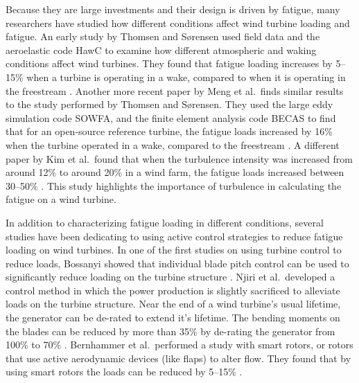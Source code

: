 \documentclass[11pt,letterpaper]{article}
\begin{document}
Because they are large investments and their design is driven by fatigue, many researchers have studied how different conditions affect wind turbine loading and fatigue.
% 
An early study by Thomsen and S{\o}rensen used field data and the aeroelastic code HawC to examine how different atmospheric and waking conditions affect wind turbines. They found that fatigue loading increases by 5--15\% when a turbine is operating in a wake, compared to when it is operating in the freestream \cite{thomsen1999fatigue}.
% 
Another more recent paper by Meng et al.~finds similar results to the study performed by Thomsen and S{\o}rensen. They used the large eddy simulation code SOWFA, and the finite element analysis code BECAS to find that for an open-source reference turbine, the fatigue loads increased by 16\% when the turbine operated in a wake, compared to the freestream \cite{meng2019study}.
% 
A different paper by Kim et al.~found that when the turbulence intensity was increased from around 12\% to around 20\% in a wind farm, the fatigue loads increased between 30--50\% \cite{kim2015study}. This study highlights the importance of turbulence in calculating the fatigue on a wind turbine.


In addition to characterizing fatigue loading in different conditions, several studies have been dedicating to using active control strategies to reduce fatigue loading on wind turbines. 
% 
In one of the first studies on using turbine control to reduce loads, Bossanyi showed that individual blade pitch control can be used to significantly reduce loading on the turbine structure \cite{bossanyi2003individual}.
% 
Njiri et al.~developed a control method in which the power production is slightly sacrificed to alleviate loads on the turbine structure. Near the end of a wind turbine's usual lifetime, the generator can be de-rated to extend it's lifetime. The bending moments on the blades can be reduced by more than 35\% by de-rating the generator from 100\% to 70\% \cite{njiri2019consideration}.
% 
Bernhammer et al.~performed a study with smart rotors, or rotors that use active aerodynamic devices (like flaps) to alter flow. They found that by using smart rotors the loads can be reduced by 5--15\% \cite{bernhammer2016fatigue}.
\end{document}
